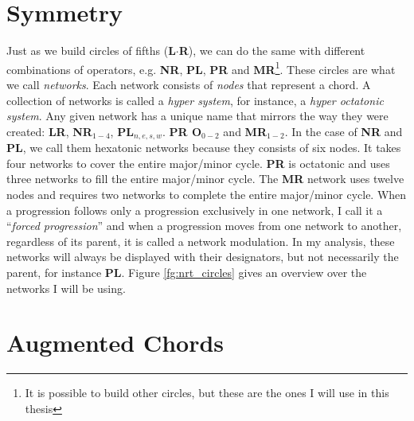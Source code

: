 \section{Symmetry}
Just as we build circles of fifths (\textbf{L\(\cdot\)R}), we can do the same with different combinations of operators, e.g. \textbf{NR}, \textbf{PL}, \textbf{PR} and \textbf{MR}\footnote{It is possible to build other circles, but these are the ones I will use in this thesis}. These circles are what we call \textit{networks}. Each network consists of \textit{nodes} that represent a chord. A collection of networks is called a \textit{hyper system}, for instance, a \textit{hyper octatonic system}. Any given network has a unique name that mirrors the way they were created: \textbf{LR}, \textbf{NR\(_{1-4}\)}, \textbf{PL\(_{n,e,s,w}\)}. \textbf{PR O\(_{0-2}\)} and \textbf{MR\(_{1-2}\)}. In the case of \textbf{NR} and \textbf{PL}, we call them hexatonic networks because they consists of six nodes. It takes four networks to cover the entire major/minor cycle. \textbf{PR} is octatonic and uses three networks to fill the entire major/minor cycle. The \textbf{MR} network uses twelve nodes and requires two networks to complete the entire major/minor cycle. When a progression follows only a progression exclusively in one network, I call it a ``\textit{forced progression}'' and when a progression moves from one network to another, regardless of its parent, it is called a network modulation. In my analysis, these networks will always be displayed with their designators, but not necessarily the parent, for instance \textbf{PL}. Figure \ref{fg:nrt_circles} gives an overview over the networks I will be using. 


	

\section{Augmented Chords} 

